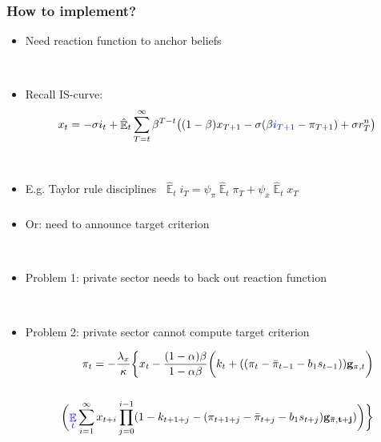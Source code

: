 \documentclass{beamer}
\DeclareMathOperator{\E}{\mathbb{E}}
\begin{document}
\begin{frame}
	\frametitle{How to implement?}
	
	\begin{itemize}
	\item Need reaction function to anchor beliefs
	
	\
	
	\item[] Recall IS-curve:
	\begin{equation*}
	x_t =  -\sigma i_t +\hat{\E}_t \sum_{T=t}^{\infty} \beta^{T-t }\big( (1-\beta)x_{T+1} - \sigma(\beta \textcolor{blue}{i_{T+1}} - \pi_{T+1}) +\sigma r_T^n \big) 
	\end{equation*}
	
	\
	
	\item E.g. Taylor rule disciplines $\; \hat{\E}_t i_T = \psi_{\pi}\hat{\E}_t\pi_{T}+\psi_{x}\hat{\E}_tx_{T}$
	\end{itemize}


\end{frame}

\begin{frame}
	\frametitle{}

\begin{itemize}
\item Or: need to announce target criterion

\

\item Problem 1: private sector needs to back out reaction function

\

\item Problem 2: private sector cannot compute target criterion

\begin{align*}
\pi_t  = -\frac{\lambda_x}{\kappa}\bigg\{x_t - \frac{(1-\alpha)\beta}{1-\alpha\beta} \bigg(k_t+((\pi_t - \bar{\pi}_{t-1}-b_1 s_{t-1}))\mathbf{g}_{\pi,t}\bigg) \\
\\
\bigg(\textcolor{blue}{\E_t}\sum_{i=1}^{\infty}x_{t+i}\prod_{j=0}^{i-1}(1-k_{t+1+j} - (\pi_{t+1+j} - \bar{\pi}_{t+j}-b_1 s_{t+j})\mathbf{g_{\bar{\pi}, t+j}}) \bigg)
\bigg\}
\end{align*}
\end{itemize}

\end{frame}
\end{document}
